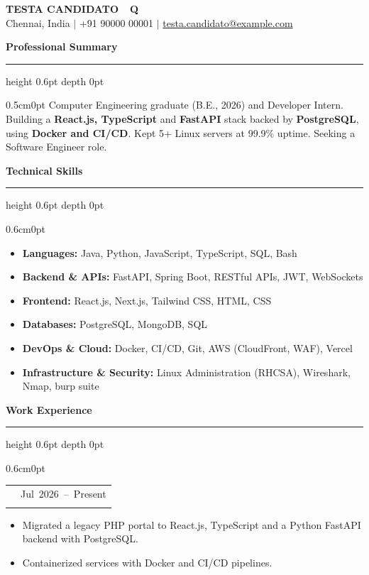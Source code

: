 \documentclass[11pt,a4paper]{article}
\makeatletter
\newcommand{\sectionhead}[2][0pt]{%
  \Needspace{6\baselineskip}\vspace{5pt}\noindent\hspace{#1}%
  {\color{gold}\bfseries\fontsize{14}{16}\selectfont #2}\hspace{4pt}%
  {\color{gold}\leaders\hrule height 0.6pt depth 0pt\hfill\kern0pt}\par\vspace{2pt}}
\newcommand{\role}[3]{%
  \noindent\begin{tabularx}{\linewidth}{@{}>{\raggedright\arraybackslash}X@{\hspace{10pt}}r@{}}
    {\bfseries\large #1} & {\small #3}\\[1pt]
    {\small\itshape #2} & \\
  \end{tabularx}\par\vspace{2pt}}
\makeatother
\begin{document}
{\color{gold}\bfseries\fontsize{25}{29}\selectfont TESTA CANDIDATO\ \ Q}\\
{\color{gold}\small Chennai, India $|$ +91 90000 00001 $|$ \href{mailto:testa.candidato@example.com}{testa.candidato@example.com}}

\vspace{6pt}

\sectionhead{Professional Summary}
\begin{adjustwidth}{0.5cm}{0pt}
\small
Computer Engineering graduate (B.E., 2026) and Developer Intern. Building a \textbf{React.js, TypeScript}
and \textbf{FastAPI} stack backed by \textbf{PostgreSQL}, using \textbf{Docker and CI/CD}. Kept 5+ Linux servers
at 99.9\% uptime. Seeking a Software Engineer role.
\end{adjustwidth}

\sectionhead[0.2cm]{Technical Skills}
\begin{adjustwidth}{0.6cm}{0pt}
\small
\begin{itemize}
  \item \textbf{Languages:} Java, Python, JavaScript, TypeScript, SQL, Bash
  \item \textbf{Backend \& APIs:} FastAPI, Spring Boot, RESTful APIs, JWT, WebSockets
  \item \textbf{Frontend:} React.js, Next.js, Tailwind CSS, HTML, CSS
  \item \textbf{Databases:} PostgreSQL, MongoDB, SQL
  \item \textbf{DevOps \& Cloud:} Docker, CI/CD, Git, AWS (CloudFront, WAF), Vercel
  \item \textbf{Infrastructure \& Security:} Linux Administration (RHCSA), Wireshark, Nmap, burp suite
\end{itemize}
\end{adjustwidth}

\sectionhead[0.2cm]{Work Experience}
\begin{adjustwidth}{0.6cm}{0pt}
\role{Developer Intern}{Example Corp $|$ Chennai}{Jul~2026~--~Present}
\small
\begin{itemize}
  \item Migrated a legacy PHP portal to React.js, TypeScript and a Python FastAPI backend with PostgreSQL.
  \item Containerized services with Docker and CI/CD pipelines.
\end{itemize}
\end{adjustwidth}
\end{document}
